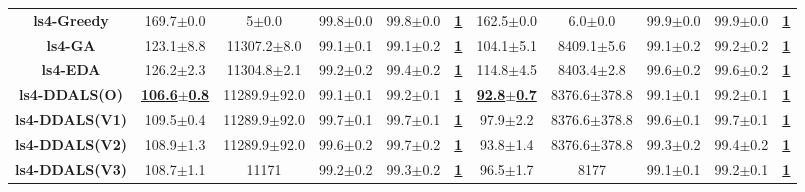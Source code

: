 \documentclass[lettersize,journal]{IEEEtran}
\begin{document}
\begin{table}[!t]
{\begin{tabular}{ccccccccccc}
    \midrule
    {\bfseries ls4-Greedy} &169.7$\pm$0.0&5$\pm$0.0 & 99.8$\pm$0.0&99.8$\pm$0.0 &\underline{\bfseries 1} &162.5$\pm$0.0&6.0$\pm$0.0& 99.9$\pm$0.0&99.9$\pm$0.0  &\underline{\bfseries 1} \\
    {\bfseries ls4-GA} &123.1$\pm$8.8&11307.2$\pm$8.0 & 99.1$\pm$0.1&99.1$\pm$0.2 &\underline{\bfseries 1} &104.1$\pm$5.1&8409.1$\pm$5.6& 99.1$\pm$0.2&99.2$\pm$0.2  &\underline{\bfseries 1} \\
    {\bfseries ls4-EDA} &126.2$\pm$2.3&11304.8$\pm$2.1 & 99.2$\pm$0.2&99.4$\pm$0.2 &\underline{\bfseries 1} &114.8$\pm$4.5& 8403.4$\pm$2.8&99.6$\pm$0.2&99.6$\pm$0.2  &\underline{\bfseries 1} \\
    {\bfseries ls4-DDALS(O)} &\underline{\bfseries 106.6$\pm$0.8} &11289.9$\pm$92.0 & 99.1$\pm$0.1&99.2$\pm$0.1 &\underline{\bfseries 1} &\underline{\bfseries 92.8$\pm$0.7} &8376.6$\pm$378.8& 99.1$\pm$0.1&99.2$\pm$0.1  &\underline{\bfseries 1} \\
    {\bfseries ls4-DDALS(V1)} &109.5$\pm$0.4&11289.9$\pm$92.0 & 99.7$\pm$0.1&99.7$\pm$0.1 &\underline{\bfseries 1} &97.9$\pm$2.2&8376.6$\pm$378.8& 99.6$\pm$0.1&99.7$\pm$0.1  &\underline{\bfseries 1} \\
    {\bfseries ls4-DDALS(V2)} &108.9$\pm$1.3&11289.9$\pm$92.0 & 99.6$\pm$0.2&99.7$\pm$0.2 &\underline{\bfseries 1} &93.8$\pm$1.4&8376.6$\pm$378.8& 99.3$\pm$0.2&99.4$\pm$0.2  &\underline{\bfseries 1} \\
    {\bfseries ls4-DDALS(V3)} &108.7$\pm$1.1&11171 & 99.2$\pm$0.2&99.3$\pm$0.2 &\underline{\bfseries 1} &96.5$\pm$1.7&8177& 99.1$\pm$0.1& 99.2$\pm$0.1  &\underline{\bfseries 1} \\
    

\end{tabular}}
\end{table}
\end{document}
